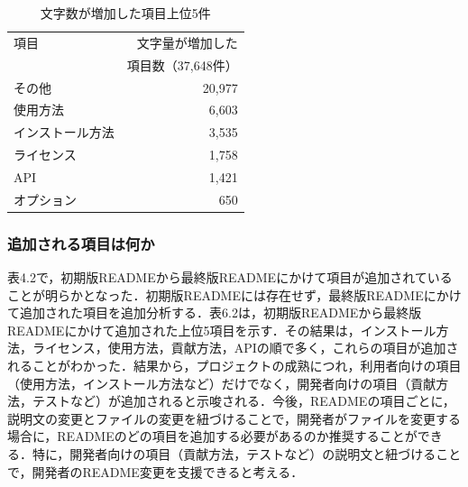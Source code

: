\documentclass[submit]{ipsj}
\begin{document}
\begin{table}[t]
  \caption{文字数が増加した項目上位5件}
  \centering
  \begin{tabular}{l|r}
    \hline\hline
    項目 & 文字量が増加した\\
    & 項目数（37,648件）\\
    \hline
    その他       & 20,977 \\
    使用方法           & 6,603 \\
    インストール方法       & 3,535 \\
    ライセンス         & 1,758 \\
    API  & 1,421 \\
    オプション  & 650 \\
    \hline
  \end{tabular}
  \label{tab:file_comparison}
\end{table}


\subsubsection{追加される項目は何か}
表4.2で，初期版READMEから最終版READMEにかけて項目が追加されていることが明らかとなった．初期版READMEには存在せず，最終版READMEにかけて追加された項目を追加分析する．表6.2は，初期版READMEから最終版READMEにかけて追加された上位5項目を示す．その結果は，インストール方法，ライセンス，使用方法，貢献方法，APIの順で多く，これらの項目が追加されることがわかった．結果から，プロジェクトの成熟につれ，利用者向けの項目（使用方法，インストール方法など）だけでなく，開発者向けの項目（貢献方法，テストなど）が追加されると示唆される．今後，READMEの項目ごとに，説明文の変更とファイルの変更を紐づけることで，開発者がファイルを変更する場合に，READMEのどの項目を追加する必要があるのか推奨することができる．特に，開発者向けの項目（貢献方法，テストなど）の説明文と紐づけることで，開発者のREADME変更を支援できると考える．


\end{document}
